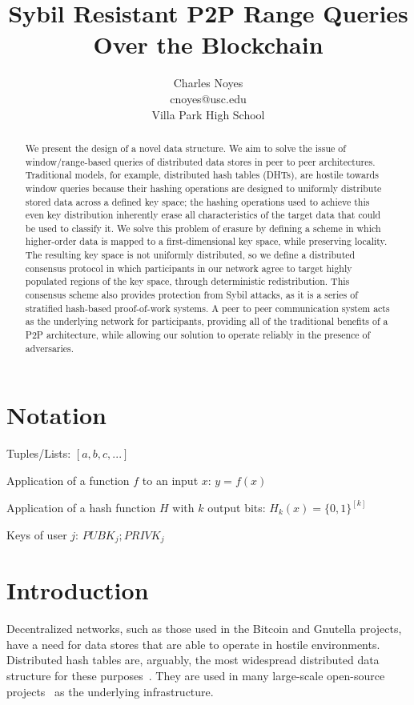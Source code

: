 \documentclass[10pt]{IEEEtran}
\title{Sybil Resistant P2P Range Queries Over the Blockchain}
\author{Charles Noyes \\ cnoyes@usc.edu \\ Villa Park High School }
\date{\vspace{-5ex}}
\begin{document}
\maketitle

\begin{abstract}
We present the design of a novel data structure. We aim to solve the issue of window/range-based queries of distributed data stores in peer to peer architectures. Traditional models, for example, distributed hash tables (DHTs), are hostile towards window queries because their hashing operations are designed to uniformly distribute stored data across a defined key space; the hashing operations used to achieve this even key distribution inherently erase all characteristics of the target data that could be used to classify it. We solve this problem of erasure by defining a scheme in which higher-order data is mapped to a first-dimensional key space, while preserving locality. The resulting key space is not uniformly distributed, so we define a distributed consensus protocol in which participants in our network agree to target highly populated regions of the key space, through deterministic redistribution. This consensus scheme also provides protection from Sybil attacks, as it is a series of stratified hash-based proof-of-work systems. A peer to peer communication system acts as the underlying network for participants, providing all of the traditional benefits of a P2P architecture, while allowing our solution to operate reliably in the presence of adversaries.
\end{abstract}


\section{Notation}

\noindent Tuples/Lists: $[a,b,c,...]$

\noindent Application of a function $f$ to an input $x$: $y=f(x)$

\noindent Application of a hash function $H$ with $k$ output bits: $H_{k}(x) = \{0,1\}^{[k]}$

\noindent Keys of user $j$: $ PUBK_j; PRIVK_j $

 
\section{Introduction}
\par Decentralized networks, such as those used in the Bitcoin and Gnutella projects, have a need for data stores that are able to operate in hostile environments. Distributed hash tables are, arguably, the most widespread distributed data structure for these purposes~\cite{Stoica:2001dj,Rowstron:2001ea,Ratnasamy:2001wn}. They are used in many large-scale open-source projects~\cite{Freitas:2013tb,Xu:2010vs,Perfitt:2010fh} as the underlying infrastructure.
\end{document}
